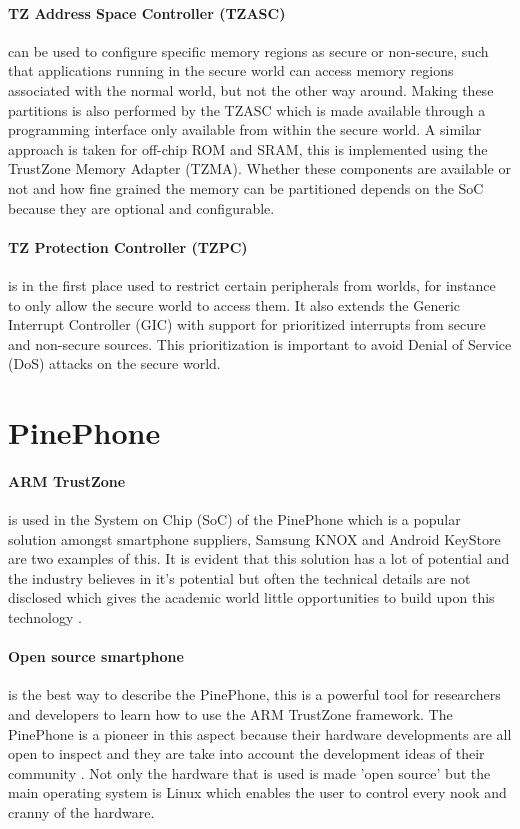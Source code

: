 \documentclass{report}
\begin{document}
\paragraph*{TZ Address Space Controller (TZASC)}
can be used to configure specific memory regions as secure or non-secure, such that applications running in the secure world can access memory regions associated with the normal world, but not the other way around. Making these partitions is also performed by the TZASC which is made available through a programming interface only available from within the secure world. A similar approach is taken for off-chip ROM and SRAM, this is implemented using the TrustZone Memory Adapter (TZMA). Whether these components are available or not and how fine grained the memory can be partitioned depends on the SoC because they are optional and configurable.

\paragraph*{TZ Protection Controller (TZPC)}
is in the first place used to restrict certain peripherals from worlds, for instance to only allow the secure world to access them.
It also extends the Generic Interrupt Controller (GIC) with support for prioritized interrupts from secure and non-secure sources. This prioritization is important to avoid Denial of Service (DoS) attacks on the secure world.  

\section{PinePhone}

\paragraph*{ARM TrustZone}
is used in the System on Chip (SoC) of the PinePhone which is a popular solution amongst smartphone suppliers, Samsung KNOX \cite{KNOX} and Android KeyStore \cite{KeyStore} are two examples of this. It is evident that this solution has a lot of potential and the industry believes in it's potential but often the technical details are not disclosed which gives the academic world little opportunities to build upon this technology \cite{PintoSandro2019DATA}.

\paragraph*{Open source smartphone} 
is the best way to describe the PinePhone, this is a powerful tool for researchers and developers to learn how to use the ARM TrustZone framework. The PinePhone is a pioneer in this aspect because their hardware developments are all open to inspect and they are take into account the development ideas of their community \cite{PinePhone}. Not only the hardware that is used is made 'open source' but the main operating system is Linux \cite{PineSoft} which enables the user to control every nook and cranny of the hardware. 
\end{document}
